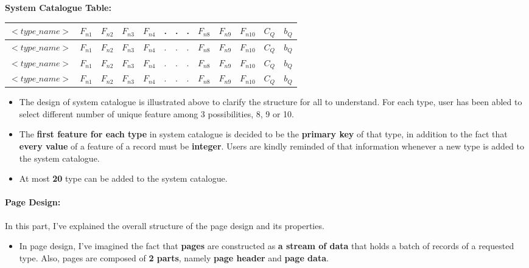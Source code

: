 \documentclass[12pt]{report}
\begin{document}
\hspace{4cm}\textbf{System Catalogue Table:} 
{
\begin{center}
\begin{tabular}{|l|l|l|l|l|l|l|l|l|l|l|l|l|}
\hline
 $<type\_name>$ & $F_{n1}$ & $F_{n2}$ & $F_{n3}$ & $F_{n4}$ & . & . & . & $F_{n8}$ & $F_{n9}$ & $F_{n{10}}$ & $C_Q$ & $b_Q$ \\
\hline
 $<type\_name>$ & $F_{n1}$ & $F_{n2}$ & $F_{n3}$ & $F_{n4}$ & . & . & . & $F_{n8}$ & $F_{n9}$ & $F_{n{10}}$ & $C_Q$ & $b_Q$ \\
\hline
 $<type\_name>$ & $F_{n1}$ & $F_{n2}$ & $F_{n3}$ & $F_{n4}$ & . & . & . & $F_{n8}$ & $F_{n9}$ & $F_{n{10}}$ & $C_Q$ & $b_Q$ \\
\hline
 $<type\_name>$ & $F_{n1}$ & $F_{n2}$ & $F_{n3}$ & $F_{n4}$ & . & . & . & $F_{n8}$ & $F_{n9}$ & $F_{n{10}}$ & $C_Q$ & $b_Q$ \\
\hline
\end{tabular}
\end{center}
}

\vspace{0.15cm}

\begin{itemize}
\item The design of system catalogue is illustrated above to clarify the structure for all to understand. For each type, user has been abled to select different number of unique feature among 3 possibilities, 8, 9 or 10.
\item The \textbf{first feature for each type} in system catalogue is decided to be the \textbf{primary  key} of that type, in addition to the fact that \textbf{every value} of a feature of a record must be \textbf{integer}. Users are kindly reminded of that information whenever a new type is added to the system catalogue.
\item At most \textbf{20} type can be added to the system catalogue.
\end{itemize}

\newpage
\paragraph{Page Design:}
In this part, I've explained the overall structure of the page design and its properties. \\

\begin{itemize}
\item In page design, I've imagined the fact that \textbf{pages} are constructed as \textbf{a stream of data} that holds a batch of records of a requested type. Also, pages are composed of \textbf{2 parts}, namely \textbf{page header} and \textbf{page data}.
\end{itemize}
\end{document}
